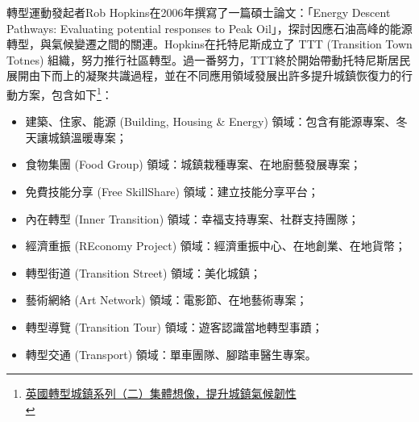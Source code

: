 \documentclass[a4paper,12pt]{article}
\begin{document}
轉型運動發起者Rob Hopkins在2006年撰寫了一篇碩士論文：「Energy Descent Pathways: Evaluating potential responses to Peak Oil」，探討因應石油高峰的能源轉型，與氣候變遷之間的關連。Hopkins在托特尼斯成立了 TTT (Transition Town Totnes) 組織，努力推行社區轉型。過一番努力，TTT終於開始帶動托特尼斯居民展開由下而上的凝聚共識過程，並在不同應用領域發展出許多提升城鎮恢復力的行動方案，包含如下\footnote{\href{https://lowestc.blogspot.com/2016/12/blog-post\_15.html}{英國轉型城鎮系列（二）集體想像，提升城鎮氣候韌性 }\\}：\\
\begin{itemize}
\item 建築、住家、能源 (Building, Housing \& Energy) 領域：包含有能源專案、冬天讓城鎮溫暖專案；\\
\item 食物集團 (Food Group) 領域：城鎮栽種專案、在地廚藝發展專案；\\
\item 免費技能分享 (Free SkillShare) 領域：建立技能分享平台；\\
\item 內在轉型 (Inner Transition) 領域：幸福支持專案、社群支持團隊；\\
\item 經濟重振 (REconomy Project) 領域：經濟重振中心、在地創業、在地貨幣；\\
\item 轉型街道 (Transition Street) 領域：美化城鎮；\\
\item 藝術網絡 (Art Network) 領域：電影節、在地藝術專案；\\
\item 轉型導覽 (Transition Tour) 領域：遊客認識當地轉型事蹟；\\
\item 轉型交通 (Transport) 領域：單車團隊、腳踏車醫生專案。\\
\end{itemize}
\end{document}
